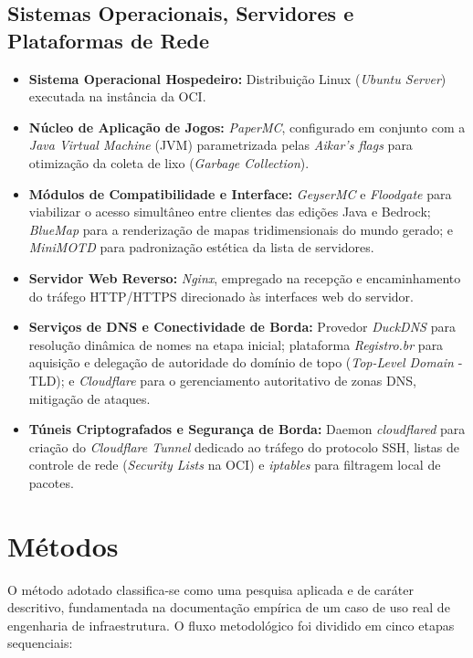 \subsection{Sistemas Operacionais, Servidores e Plataformas de Rede}
\begin{itemize}
    \item \textbf{Sistema Operacional Hospedeiro:} Distribuição Linux (\textit{Ubuntu Server}) executada na instância da OCI.
    \item \textbf{Núcleo de Aplicação de Jogos:} \textit{PaperMC}, configurado em conjunto com a \textit{Java Virtual Machine} (JVM) parametrizada pelas \textit{Aikar's flags} para otimização da coleta de lixo (\textit{Garbage Collection}).
    \item \textbf{Módulos de Compatibilidade e Interface:} \textit{GeyserMC} e \textit{Floodgate} para viabilizar o acesso simultâneo entre clientes das edições Java e Bedrock; \textit{BlueMap} para a renderização de mapas tridimensionais do mundo gerado; e \textit{MiniMOTD} para padronização estética da lista de servidores.
    \item \textbf{Servidor Web Reverso:} \textit{Nginx}, empregado na recepção e encaminhamento do tráfego HTTP/HTTPS direcionado às interfaces web do servidor.
    \item \textbf{Serviços de DNS e Conectividade de Borda:} Provedor \textit{DuckDNS} para resolução dinâmica de nomes na etapa inicial; plataforma \textit{Registro.br} para aquisição e delegação de autoridade do domínio de topo (\textit{Top-Level Domain} - TLD); e \textit{Cloudflare} para o gerenciamento autoritativo de zonas DNS, mitigação de ataques.
    \item \textbf{Túneis Criptografados e Segurança de Borda:} Daemon \textit{cloudflared} para criação do \textit{Cloudflare Tunnel} dedicado ao tráfego do protocolo SSH, listas de controle de rede (\textit{Security Lists} na OCI) e \textit{iptables} para filtragem local de pacotes.
\end{itemize}


	\section{Métodos}
	\label{capitulo-metodologia-metodos}
    O método adotado classifica-se como uma pesquisa aplicada e de caráter descritivo, fundamentada na documentação empírica de um caso de uso real de engenharia de infraestrutura. O fluxo metodológico foi dividido em cinco etapas sequenciais:

